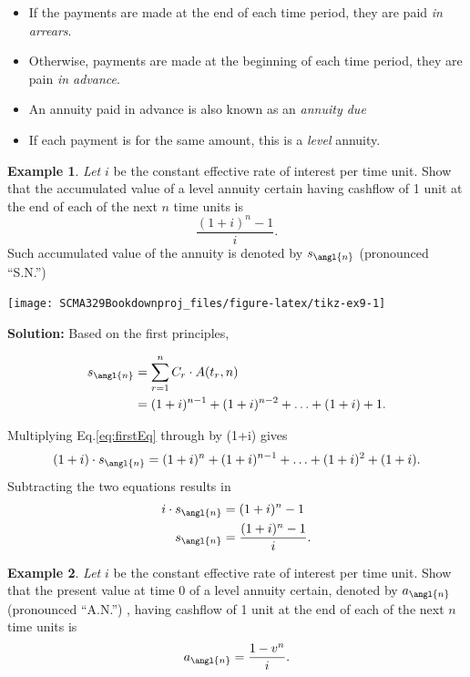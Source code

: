 \documentclass[
]{book}
\theoremstyle{definition}
\theoremstyle{definition}
\newtheorem{example}{Example}[chapter]
\theoremstyle{definition}
\theoremstyle{definition}
\theoremstyle{remark}
\begin{document}
\begin{itemize}
\item
  If the payments are made at the end of each time period, they are paid \emph{in arrears}.
\item
  Otherwise, payments are made at the beginning of each time period,
  they are pain \emph{in advance}.
\item
  An annuity paid in advance is also known as an \emph{annuity due}
\item
  If each payment is for the same amount, this is a \emph{level} annuity.
\end{itemize}

\begin{example}
\emph{Let} \(i\) be the constant effective rate of interest per time unit. Show
that the accumulated value of a level annuity certain having cashflow of
1 unit at the end of each of the next \(n\) time units is
\[\frac{(1+i)^n -1 }{i}.\] Such accumulated value of the annuity is
denoted by \(s_\angl{n}\) (pronounced ``S.N.'')
\end{example}

\begin{center}\texttt{[image: SCMA329Bookdownproj\_files/figure-latex/tikz-ex9-1]} \end{center}

\textbf{Solution:} Based on the first principles,

\begin{align} 
 s_\angl{n} &= \sum_{r=1}^n C_r \cdot A(t_r,n) \\
    &= (1+i)^{n-1} + (1+i)^{n-2} + \ldots + (1+i) + 1. \label{eq:firstEq} 
\end{align}

Multiplying Eq.\eqref{eq:firstEq} through by (1+i) gives \begin{equation}
    (1+i) \cdot s_\angl{n}  = (1+i)^{n} + (1+i)^{n-1} + \ldots + (1+i)^2 + (1+i). 
\end{equation} Subtracting the two equations results in
\[\begin{aligned}
    i \cdot s_\angl{n} &= (1+i)^{n} - 1\\
        s_\angl{n} &= \frac{(1+i)^{n} - 1}{i}.\end{aligned}\]

\begin{example}
\emph{Let} \(i\) be the constant effective rate of interest per time unit. Show
that the present value at time 0 of a level annuity certain, denoted by
\(a_\angl{n}\) (pronounced ``A.N.'') , having cashflow of 1 unit at the end
of each of the next \(n\) time units is
\[a_\angl{n} = \frac{1 - v^n }{i}.\]
\end{example}
\end{document}
